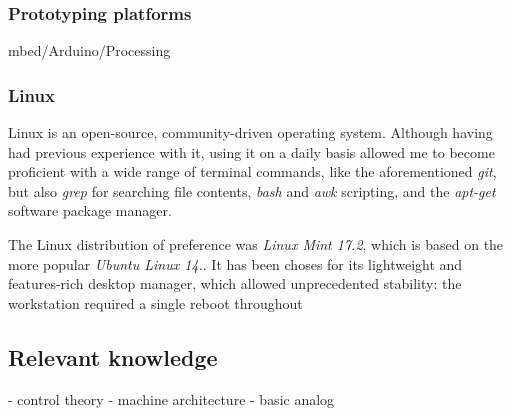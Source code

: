 \subsubsection{Prototyping platforms}
mbed/Arduino/Processing


\subsubsection{Linux}
Linux is an open-source, community-driven operating system.
Although having had previous experience with it, using it on a daily basis allowed me to become proficient with a wide range of terminal commands, like the aforementioned \emph{git}, but also \emph{grep} for searching file contents, \emph{bash} and \emph{awk} scripting, and the \emph{apt-get} software package manager.

The Linux distribution of preference was \emph{Linux Mint 17.2}, which is based on the more popular \emph{Ubuntu Linux 14.}.
It has been choses for its lightweight and features-rich desktop manager, which allowed unprecedented stability: the workstation required a single reboot throughout



\subsection{Relevant knowledge}

- control theory
- machine architecture
- basic analog
